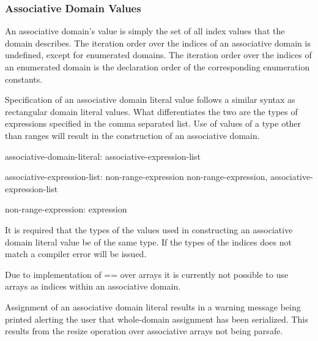 \subsubsection{Associative Domain Values}
\label{Associative_Domain_Values}

An associative domain's value is simply the set of all index values
that the domain describes.  The iteration order over the indices of
an associative domain is undefined, except for enumerated domains.
The iteration order over the indices of an enumerated domain
is the declaration order of the corresponding enumeration constants.


Specification of an associative domain literal value follows a similar syntax as
rectangular domain literal values.  What differentiates the two are the types 
of expressions specified in the comma separated list.  Use of values of a 
type other than ranges will result in the construction of an associative domain.  

\begin{syntax}
associative-domain-literal:
   { associative-expression-list }

associative-expression-list:
   non-range-expression
   non-range-expression, associative-expression-list

non-range-expression:
   expression
\end{syntax}

It is required that the types of the values used in constructing an associative
domain literal value be of the same type.  If the types of the indices does not
match a compiler error will be issued.

\begin{future}
Due to implementation of == over arrays it is currently not possible to use
arrays as indices within an associative domain. 
\end{future}

\begin{openissue}
Assignment of an associative domain literal results in a warning message
being printed alerting the user that whole-domain assignment has been
serialized. This results from the resize operation over associative arrays not
being parsafe. 
\end{openissue}

